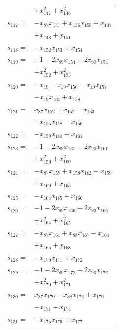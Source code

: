 \begin{longtable}{@{}r@{\;}l@{}}
 & \(\displaystyle +x_{147}^{2} +x_{148}^{2}\) \\[3pt]
\(s_{117}=\) & \(\displaystyle -x_{87}x_{147} +x_{136}x_{150} -x_{147}\) \\
 & \(\displaystyle +x_{148} +x_{151}\) \\[3pt]
\(s_{118}=\) & \(\displaystyle -x_{152}x_{153} +x_{154}\) \\[3pt]
\(s_{119}=\) & \(\displaystyle -1 -2x_{89}x_{154} -2x_{90}x_{154}\) \\
 & \(\displaystyle +x_{152}^{2} +x_{153}^{2}\) \\[3pt]
\(s_{120}=\) & \(\displaystyle -x_{19} -x_{19}x_{156} -x_{19}x_{157}\) \\
 & \(\displaystyle -x_{19}x_{163} +x_{158}\) \\[3pt]
\(s_{121}=\) & \(\displaystyle x_{87}x_{152} +x_{152} -x_{153}\) \\
 & \(\displaystyle -x_{155}x_{158} -x_{156}\) \\[3pt]
\(s_{122}=\) & \(\displaystyle -x_{159}x_{160} +x_{161}\) \\[3pt]
\(s_{123}=\) & \(\displaystyle -1 -2x_{89}x_{161} -2x_{90}x_{161}\) \\
 & \(\displaystyle +x_{159}^{2} +x_{160}^{2}\) \\[3pt]
\(s_{124}=\) & \(\displaystyle -x_{87}x_{159} +x_{158}x_{162} -x_{159}\) \\
 & \(\displaystyle +x_{160} +x_{163}\) \\[3pt]
\(s_{125}=\) & \(\displaystyle -x_{164}x_{165} +x_{166}\) \\[3pt]
\(s_{126}=\) & \(\displaystyle -1 -2x_{89}x_{166} -2x_{90}x_{166}\) \\
 & \(\displaystyle +x_{164}^{2} +x_{165}^{2}\) \\[3pt]
\(s_{127}=\) & \(\displaystyle -x_{87}x_{164} +x_{88}x_{167} -x_{164}\) \\
 & \(\displaystyle +x_{165} +x_{168}\) \\[3pt]
\(s_{128}=\) & \(\displaystyle -x_{170}x_{171} +x_{172}\) \\[3pt]
\(s_{129}=\) & \(\displaystyle -1 -2x_{89}x_{172} -2x_{90}x_{172}\) \\
 & \(\displaystyle +x_{170}^{2} +x_{171}^{2}\) \\[3pt]
\(s_{130}=\) & \(\displaystyle x_{87}x_{170} -x_{88}x_{173} +x_{170}\) \\
 & \(\displaystyle -x_{171} -x_{174}\) \\[3pt]
\(s_{131}=\) & \(\displaystyle -x_{175}x_{176} +x_{177}\) \\[3pt]

\end{longtable}
